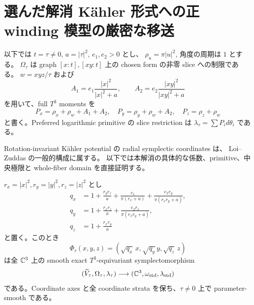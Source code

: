 \section{選んだ解消 Kähler 形式への正 winding 模型の厳密な移送}
\label{tp:section}


以下では $t=\tau\ne0$, $a=|\tau|^2$, $e_1,e_2>0$ とし、
$\rho_u=\pi|u|^2$, 角度の周期は $1$ とする。
$\Omega_\tau$ は graph $[x:t],[xy:t]$ 上の chosen form の非零 slice への制限である。
$w=xyz/\tau$ および
\[
 A_1=e_1\frac{|x|^2}{|x|^2+a},\qquad
 A_2=e_2\frac{|xy|^2}{|xy|^2+a}
\]
を用いて、full $T^3$ moments を
\[
 P_x=\rho_x+\rho_w+A_1+A_2,\quad
 P_y=\rho_y+\rho_w+A_2,\quad P_z=\rho_z+\rho_w
\]
と書く。Preferred logarithmic primitive の slice restriction は
$\lambda_\tau=\sum P_i d\theta_i$ である。

Rotation-invariant Kähler potential の radial symplectic coordinates は、
Loi--Zuddas \cite[Theorem 1.1]{loi-zuddas-local} の一般的構成に属する。
以下では本解消の具体的な係数、primitive、中央極限と whole-fiber domain を直接証明する。

\begin{proposition}\label{tp:radial}

$r_x=|x|^2,r_y=|y|^2,r_z=|z|^2$ とし
\begin{align*}
 q_x&=1+\frac{r_yr_z}{a}+\frac{e_1}{\pi(r_x+a)}
                  +\frac{e_2r_y}{\pi(r_xr_y+a)},\\
 q_y&=1+\frac{r_xr_z}{a}+\frac{e_2r_x}{\pi(r_xr_y+a)},\\
 q_z&=1+\frac{r_xr_y}{a}
\end{align*}
と置く。このとき
\[
 \Phi_\tau(x,y,z)=(\sqrt{q_x}\,x,\sqrt{q_y}\,y,\sqrt{q_z}\,z)
\]
は全 $\mathbb C^3$ 上の smooth exact $T^3$-equivariant symplectomorphism
\[
 (\widetilde V_\tau,\Omega_\tau,\lambda_\tau)
 \longrightarrow(\mathbb C^3,\omega_{\rm std},\lambda_{\rm std})
\]
である。Coordinate axes と全 coordinate strata を保ち、$\tau\ne0$ 上で parameter-smooth である。
\end{proposition}

